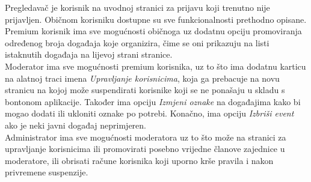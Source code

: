 		\eject
	
		\indent Pregledavač je korisnik na uvodnoj stranici za prijavu koji trenutno nije prijavljen. Običnom korisniku dostupne su sve funkcionalnosti prethodno opisane. \\
		
		\indent Premium korisnik ima sve mogućnosti običnoga uz dodatnu opciju promoviranja određenog broja događaja koje organizira, čime se oni prikazuju na listi istaknutih događaja na lijevoj strani stranice. \\
		
		\indent Moderator ima sve mogućnosti premium korisnika, uz to što ima dodatnu karticu na alatnoj traci imena \textit{Upravljanje korisnicima}, koja ga prebacuje na novu stranicu na kojoj može suspendirati korisnike koji se ne ponašaju u skladu s bontonom aplikacije. Također ima opciju \textit{Izmjeni oznake} na događajima kako bi mogao dodati ili ukloniti oznake po potrebi. Konačno, ima opciju \textit{Izbriši event} ako je neki javni događaj neprimjeren. \\
		
		\indent Administrator ima sve mogućnosti moderatora uz to što može na stranici za upravljanje korisnicima ili promovirati posebno vrijedne članove zajednice u moderatore, ili obrisati račune korisnika koji uporno krše pravila i nakon privremene suspenzije.
		
		\eject
		
	